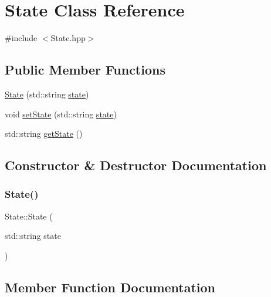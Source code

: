 \hypertarget{class_state}{}\section{State Class Reference}
\label{class_state}


{\ttfamily \#include $<$State.\+hpp$>$}

\subsection*{Public Member Functions}
\begin{DoxyCompactItemize}
\item 
\mbox{\hyperlink{class_state_aeb74cd119de80264e758b143d65b19f5}{State}} (std\+::string \mbox{\hyperlink{states_8hpp_adc6e5733fc3c22f0a7b2914188c49c90}{state}})
\item 
void \mbox{\hyperlink{class_state_ad267a860927ae9032e808d06d5fc9d30}{set\+State}} (std\+::string \mbox{\hyperlink{states_8hpp_adc6e5733fc3c22f0a7b2914188c49c90}{state}})
\item 
std\+::string \mbox{\hyperlink{class_state_ad8697cb367f8b1453a1412426fc248ae}{get\+State}} ()
\end{DoxyCompactItemize}


\subsection{Constructor \& Destructor Documentation}
\mbox{\label{class_state_aeb74cd119de80264e758b143d65b19f5}} 
\subsubsection{\texorpdfstring{State()}{State()}}
{\footnotesize\ttfamily State\+::\+State (\begin{DoxyParamCaption}\item[{std\+::string}]{state }\end{DoxyParamCaption})}



\subsection{Member Function Documentation}
\mbox{\label{class_state_ad8697cb367f8b1453a1412426fc248ae}} 
